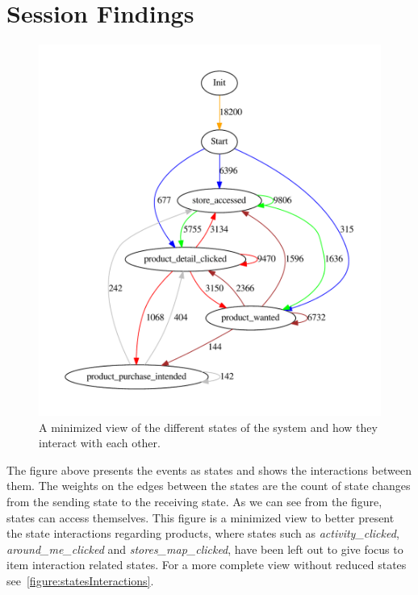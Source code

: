 \section{Session Findings}
    \label{sec:sessionFindings}
    \begin{figure}[H]
        \includegraphics[width=5in]{image/statesInteractionTrue-gvfile.pdf}
        \centering
        \caption{A minimized view of the different states of the system and how they interact with each other.}
        \label{figure:minStatesInteractions}
    \end{figure}
        The figure above presents the events as states and shows the interactions between them.
        The weights on the edges between the states are the count of state changes from the sending state to the receiving state.
        As we can see from the figure, states can access themselves.
        This figure is a minimized view to better present the state interactions regarding products, where states such as \emph{activity\_clicked}, \emph{around\_me\_clicked} and \emph{stores\_map\_clicked}, have been left out to give focus to item interaction related states.
        For a more complete view without reduced states see~\ref{figure:statesInteractions}.

